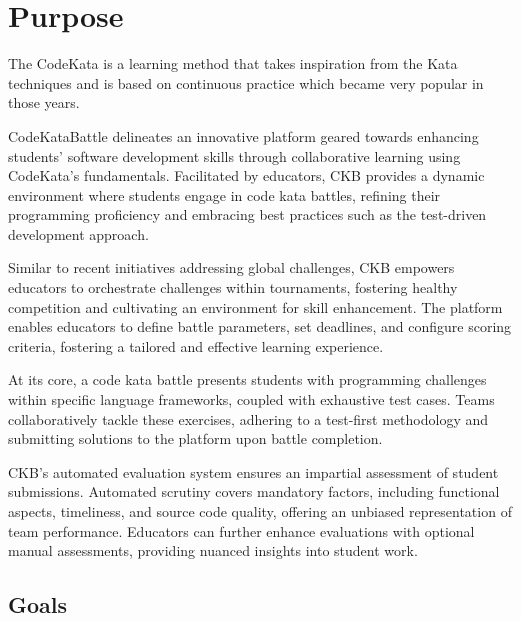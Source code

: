 \renewcommand{\arraystretch}{1.5} %

\section{Purpose}
\label{s:Purpose}%

The CodeKata is a learning method that takes inspiration from the Kata techniques and is based on continuous practice which became very popular in those years.

CodeKataBattle delineates an innovative platform geared towards enhancing students' software development skills through collaborative learning using CodeKata’s fundamentals. Facilitated by educators, CKB provides a dynamic environment where students engage in code kata battles, refining their programming proficiency and embracing best practices such as the test-driven development approach.

Similar to recent initiatives addressing global challenges, CKB empowers educators to orchestrate challenges within tournaments, fostering healthy competition and cultivating an environment for skill enhancement. The platform enables educators to define battle parameters, set deadlines, and configure scoring criteria, fostering a tailored and effective learning experience.

At its core, a code kata battle presents students with programming challenges within specific language frameworks, coupled with exhaustive test cases. Teams collaboratively tackle these exercises, adhering to a test-first methodology and submitting solutions to the platform upon battle completion.

CKB's automated evaluation system ensures an impartial assessment of student submissions. Automated scrutiny covers mandatory factors, including functional aspects, timeliness, and source code quality, offering an unbiased representation of team performance. Educators can further enhance evaluations with optional manual assessments, providing nuanced insights into student work.


\subsection{Goals}
\label{ss:goals}%

